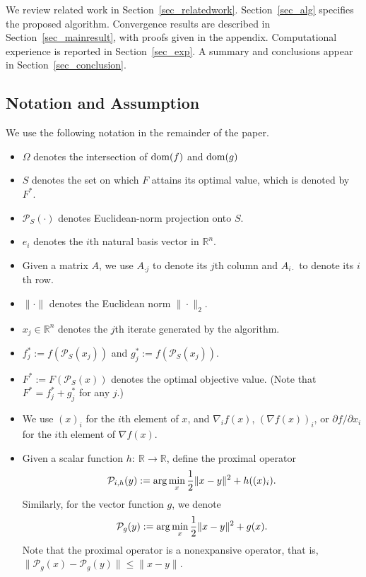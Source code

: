 \documentclass{siamltex}
\begin{document}
We review related work in
Section~\ref{sec_relatedwork}. Section~\ref{sec_alg} specifies the
proposed algorithm. Convergence results are described in
Section~\ref{sec_mainresult}, with proofs given in the
appendix. Computational experience is reported in
Section~\ref{sec_exp}. A summary and conclusions appear in
Section~\ref{sec_conclusion}.

\subsection*{Notation and Assumption}\label{sec_NA}

We use the following notation in the remainder of the paper.
\begin{itemize}
\item $\Omega$ denotes the intersection of ${\rm dom}(f)$ and ${\rm dom}(g)$
\item $S$ denotes the set on which $F$ attains its optimal value,
  which is denoted by $F^*$.
\item ${\mathcal{P}_{S}}(\cdot)$ denotes Euclidean-norm projection onto $S$.
\item $e_i$ denotes the $i$th natural basis vector in $\mathbb{R}^n$.
\item Given a matrix $A$, we use $A_{\cdot j}$ to denote its $j$th
  column and $A_{i \cdot}$ to denote its $i$th row.
\item $\| \cdot \|$ denotes the Euclidean norm $\|\cdot \|_2$.
\item $x_j \in \mathbb{R}^n$ denotes the $j$th iterate generated by
  the algorithm.
\item $f^*_j:=f({\mathcal{P}_{S}}(x_j))$ and $g^*_j:=f({\mathcal{P}_{S}}(x_j))$.
\item $F^*:=F({\mathcal{P}_{S}}(x))$ denotes the optimal objective value. (Note that
  $F^*=f^*_j + g^*_j$ for any $j$.)
\item We use $(x)_i$ for the $i$th element of $x$, and $\nabla_i f(x)$,
  $(\nabla f(x))_{i}$, or $\partial f / \partial x_i$ for the $i$th
  element of $\nabla f(x)$.
\item Given a scalar function $h:~{\mathbb{R}}\rightarrow {\mathbb{R}}$, define the
  proximal operator
\[
{\mathcal{P}}_{i,h}(y): = {\rm arg}\min_x {1\over 2}\|x-y\|^2 +
  h((x)_i).
\]
Similarly, for the vector function $g$, we denote
\[
{\mathcal{P}}_g(y):={\rm arg}\min_x {1\over 2}\|x-y\|^2 + g(x).
\]
Note that the proximal operator is a nonexpansive operator, that is,
$\|{\mathcal{P}}_g(x) - {\mathcal{P}}_g(y)\| \leq \|x-y\|$.
\end{itemize}
\end{document}
